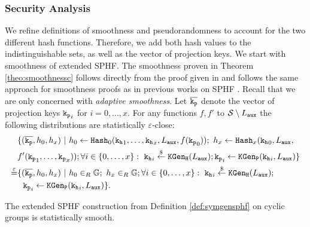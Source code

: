 \subsubsection{Security Analysis}
We refine definitions of smoothness and pseudorandomness to account for the two different hash functions.
Therefore, we add both hash values to the indistinguishable sets, as well as the vector of projection keys.
We start with smoothness of extended \ac{SPHF}.
The smoothness proven in Theorem \ref{theo:smoothnessc} follows directly from the proof given in \cite[Appendix D.3]{cryptoeprint:2013:034} and follows the same approach for smoothness proofs as in previous works on \ac{SPHF} \cite{cryptoeprint:2013:034,Gennaro2003,Katz2011}.
Recall that we are only concerned with \emph{adaptive smoothness}.
Let $\overline{\mathtt{k_p}}$ denote the vector of projection keys $\mathtt{k_p}_i$ for $i=0,\dots,x$.
For any functions $f,f'$ to $\mathcal{S}\setminus L_\mathtt{aux}$ the following distributions are statistically $\varepsilon$-close:
\begin{align*}
& \{(\overline{\mathtt{k_p}},h_0,h_x) ~|~ h_0\gets\mathtt{Hash}_0(\mathtt{k_h}_1,\dots,\mathtt{k_h}_x,L_\mathtt{aux},f(\mathtt{k_p}_0));~ h_x\gets\mathtt{Hash}_x(\mathtt{k_h}_0,L_\mathtt{aux}, \\
& f'(\mathtt{k_p}_1,\dots,\mathtt{k_p}_x)); \forall i\in\{0,\dots,x\}:~ \mathtt{k_h}_i\stackrel{\$}{\gets}\mathtt{KGen_H}(L_\mathtt{aux}); \mathtt{k_p}_i\gets\mathtt{KGen_P}(\mathtt{k_h}_i,L_\mathtt{aux})\} \\
\stackrel{\varepsilon}{=} & \{(\overline{\mathtt{k_p}},h_0,h_x) ~|~ h_0\in_R\mathbb{G};~ h_x\in_R\mathbb{G}; \forall i\in\{0,\dots,x\}:~ \mathtt{k_h}_i\stackrel{\$}{\gets}\mathtt{KGen_H}(L_\mathtt{aux}); \\
& ~~\mathtt{k_p}_i\gets\mathtt{KGen_P}(\mathtt{k_h}_i,L_\mathtt{aux})\}.
\end{align*}

\begin{theorem}\label{theo:smoothnessc}
The extended \ac{SPHF} construction from Definition \ref{def:symgensphf} on cyclic groups is statistically smooth.
\end{theorem}

